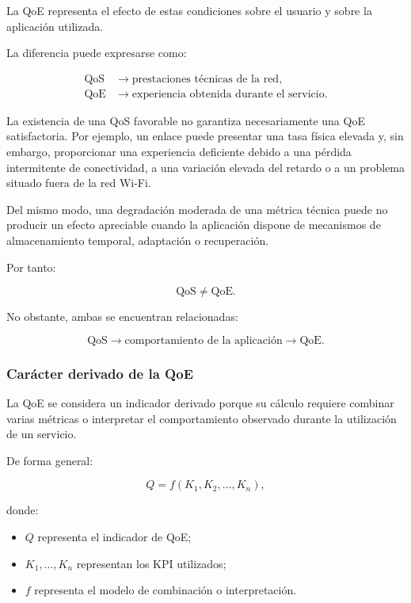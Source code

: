 La QoE representa el efecto de estas condiciones sobre el usuario y sobre
la aplicación utilizada.

La diferencia puede expresarse como:

\[
\begin{aligned}
    \mathrm{QoS}
    &\longrightarrow
    \text{prestaciones técnicas de la red},\\
    \mathrm{QoE}
    &\longrightarrow
    \text{experiencia obtenida durante el servicio}.
\end{aligned}
\]

La existencia de una QoS favorable no garantiza necesariamente una QoE
satisfactoria. Por ejemplo, un enlace puede presentar una tasa física
elevada y, sin embargo, proporcionar una experiencia deficiente debido a
una pérdida intermitente de conectividad, a una variación elevada del
retardo o a un problema situado fuera de la red Wi-Fi.

Del mismo modo, una degradación moderada de una métrica técnica puede no
producir un efecto apreciable cuando la aplicación dispone de mecanismos
de almacenamiento temporal, adaptación o recuperación.

Por tanto:

\[
    \mathrm{QoS}
    \neq
    \mathrm{QoE}.
\]

No obstante, ambas se encuentran relacionadas:

\[
    \mathrm{QoS}
    \longrightarrow
    \text{comportamiento de la aplicación}
    \longrightarrow
    \mathrm{QoE}.
\]


\subsubsection*{Carácter derivado de la QoE}

La QoE se considera un indicador derivado porque su cálculo requiere
combinar varias métricas o interpretar el comportamiento observado
durante la utilización de un servicio.

De forma general:

\[
    Q
    =
    f
    \left(
        K_1,
        K_2,
        \ldots,
        K_n
    \right),
\]

donde:

\begin{itemize}
    \item \(Q\) representa el indicador de QoE;

    \item \(K_1,\ldots,K_n\) representan los KPI utilizados;

    \item \(f\) representa el modelo de combinación o interpretación.
\end{itemize}

